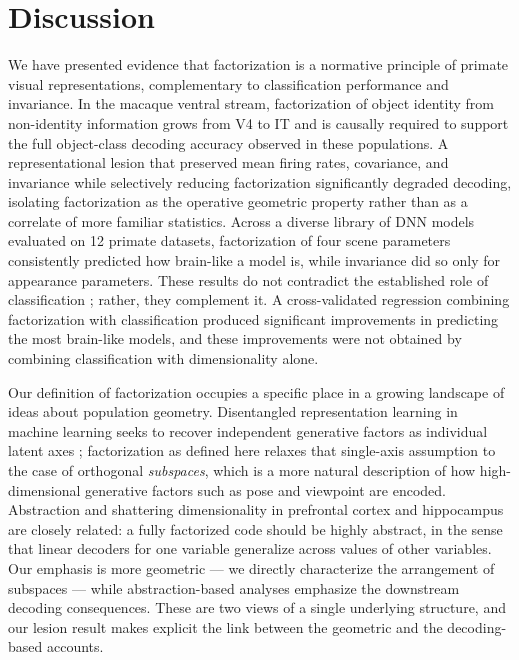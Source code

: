 \documentclass[11pt]{article}
\begin{document}
\section{Discussion}

We have presented evidence that factorization is a normative principle of
primate visual representations, complementary to classification performance
and invariance. In the macaque ventral stream, factorization of object
identity from non-identity information grows from V4 to IT and is
causally required to support the full object-class decoding accuracy
observed in these populations. A representational lesion that preserved
mean firing rates, covariance, and invariance while selectively reducing
factorization significantly degraded decoding, isolating factorization as
the operative geometric property rather than as a correlate of more
familiar statistics. Across a diverse library of DNN models evaluated on
12 primate datasets, factorization of four scene parameters consistently
predicted how brain-like a model is, while invariance did so only for
appearance parameters. These results do not contradict the established role
of classification \citep{yamins2014performance, majaj2015simple}; rather,
they complement it. A cross-validated regression combining factorization
with classification produced significant improvements in predicting the
most brain-like models, and these improvements were not obtained by
combining classification with dimensionality alone.

Our definition of factorization occupies a specific place in a growing
landscape of ideas about population geometry. Disentangled representation
learning in machine learning seeks to recover independent generative
factors as individual latent axes \citep{higgins2017beta}; factorization as
defined here relaxes that single-axis assumption to the case of orthogonal
\emph{subspaces}, which is a more natural description of how
high-dimensional generative factors such as pose and viewpoint are encoded.
Abstraction and shattering dimensionality in prefrontal cortex and
hippocampus \citep{bernardi2020geometry, rigotti2013importance, fusi2016why}
are closely related: a fully factorized code should be highly abstract, in
the sense that linear decoders for one variable generalize across values of
other variables. Our emphasis is more geometric --- we directly characterize
the arrangement of subspaces --- while abstraction-based analyses emphasize
the downstream decoding consequences. These are two views of a single
underlying structure, and our lesion result makes explicit the link between
the geometric and the decoding-based accounts.
\end{document}
